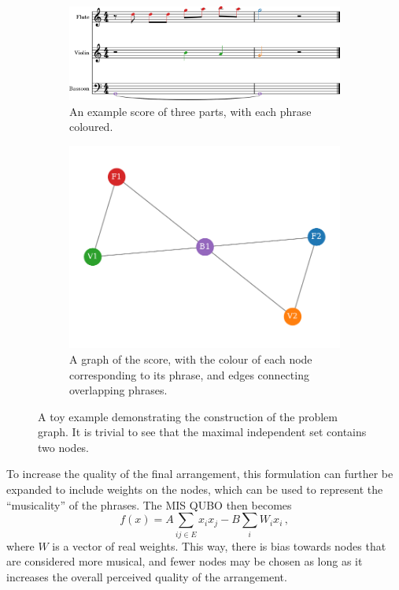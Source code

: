 \documentclass[aps,pra,12pt,onecolumn]{revtex4-2}
\begin{document}
\begin{figure}[h]
    \begin{subfigure}[t]{0.5\linewidth}
        \includegraphics[width=0.95\linewidth]{../Figures/toy_trim-1.png}
        \caption{An example score of three parts, with each phrase coloured.}
        \label{fig:simple-excerpt}
    \end{subfigure}\hfill
    \begin{subfigure}[t]{0.5\linewidth}
        \includegraphics[width=0.95\linewidth]{../Figures/toy_graph.pdf}
        \caption{A graph of the score, with the colour of each node corresponding to its phrase, and edges connecting overlapping phrases.}
        \label{fig:simple-graph}
    \end{subfigure}
    \caption{A toy example demonstrating the construction of the problem graph. It is trivial to see that the maximal independent set contains two nodes.}
    \label{fig:toy}
\end{figure}

To increase the quality of the final arrangement, this formulation can further be expanded to include weights on the nodes, which can be used to represent the ``musicality'' of the phrases. The MIS QUBO then becomes
\begin{equation}
    f(x)=A\sum_{ij\in E}x_ix_j-B\sum_i W_ix_i\,,
    \label{eq:weightedMIS}
\end{equation}
where $W$ is a vector of real weights. This way, there is bias towards nodes that are considered more musical, and fewer nodes may be chosen as long as it increases the overall perceived quality of the arrangement. 
\end{document}
